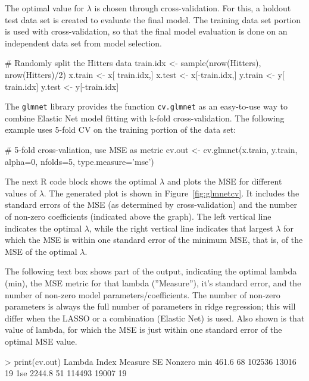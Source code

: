 \begin{withcode}
The optimal value for $\lambda$ is chosen through cross-validation. For this, a holdout test data set is created to evaluate the final model. The training data set portion is used with cross-validation, so that the final model evaluation is done on an independent data set from model selection. 

\begin{Rcode}
# Randomly split the Hitters data
train.idx <- sample(nrow(Hitters), nrow(Hitters)/2)
x.train <- x[ train.idx,]
x.test  <- x[-train.idx,]
y.train <- y[ train.idx]
y.test  <- y[-train.idx]
\end{Rcode}

\noindent The \texttt{glmnet} library provides the function \texttt{cv.glmnet} as an easy-to-use way to combine Elastic Net model fitting with k-fold cross-validation. The following example uses 5-fold CV on the training portion of the data set:

\begin{Rcode}
# 5-fold cross-valiation, use MSE as metric
cv.out <- cv.glmnet(x.train, y.train, alpha=0, 
                    nfolds=5, type.measure='mse')
\end{Rcode}

The next R code block shows the optimal $\lambda$ and plots the MSE for different values of $\lambda$. The generated plot is shown in Figure~\ref{fig:glmnetcv}. It includes the standard errors of the MSE (as determined by cross-validation) and the number of non-zero coefficients (indicated above the graph). The left vertical line indicates the optimal $\lambda$, while the right vertical line indicates that largest $\lambda$ for which the MSE is within one standard error of the minimum MSE, that is, of the MSE of the optimal $\lambda$.


The following text box shows part of the output, indicating the optimal lambda (min), the MSE metric for that lambda (''Measure''), it's standard error, and the number of non-zero model parameters/coefficients. The number of non-zero parameters is always the full number of parameters in ridge regression; this will differ when the LASSO or a combination (Elastic Net) is used. Also shown is that value of lambda, for which the MSE is just within one standard error of the optimal MSE value. 

\begin{textcode}
> print(cv.out)
    Lambda Index Measure    SE Nonzero
min  461.6    68  102536 13016      19
1se 2244.8    51  114493 19007      19
\end{textcode}



\end{withcode}
